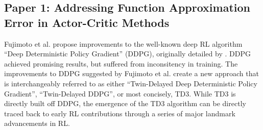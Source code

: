 \documentclass{article}
\begin{document}
\subsection{Paper 1: Addressing Function Approximation Error in Actor-Critic Methods \citep{td3}}
Fujimoto et al. propose improvements to the well-known deep RL algorithm ``Deep Deterministic Policy Gradient'' (DDPG), originally detailed by \citep{ddpg}. DDPG achieved promising results, but suffered from inconsitency in training. The improvements to DDPG suggested by Fujimoto et al. create a new approach that is interchangeably referred to as either ``Twin-Delayed Deep Deterministic Policy Gradient'', ``Twin-Delayed DDPG'', or most concisely, TD3. While TD3 is directly built off DDPG, the emergence of the TD3 algorithm can be directly traced back to early RL contributions through a series of major landmark advancements in RL.  
\end{document}
